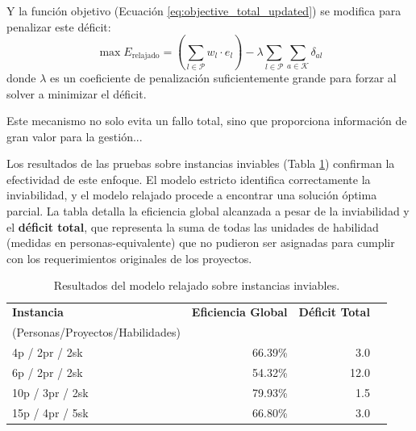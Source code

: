 \documentclass[conference]{IEEEtran}
\begin{document}
Y la función objetivo (Ecuación \ref{eq:objective_total_updated}) se modifica para penalizar este déficit:
\begin{equation}
    \max E_{\text{relajado}} = \left( \sum_{l \in \mathcal{P}} w_l \cdot e_l \right) - \lambda \sum_{l \in \mathcal{P}} \sum_{a \in \mathcal{K}} \delta_{al}
    \label{eq:objective_total_relaxed}
\end{equation}
donde \(\lambda\) es un coeficiente de penalización suficientemente grande para forzar al solver a minimizar el déficit.

Este mecanismo no solo evita un fallo total, sino que proporciona información de gran valor para la gestión...

Los resultados de las pruebas sobre instancias inviables (Tabla \ref{tab:infeasible}) confirman la efectividad de este enfoque. El modelo estricto identifica correctamente la inviabilidad, y el modelo relajado procede a encontrar una solución óptima parcial. La tabla detalla la eficiencia global alcanzada a pesar de la inviabilidad y el \textbf{déficit total}, que representa la suma de todas las unidades de habilidad (medidas en personas-equivalente) que no pudieron ser asignadas para cumplir con los requerimientos originales de los proyectos.

\begin{table}[htbp]
    \centering
    \caption{Resultados del modelo relajado sobre instancias inviables.}
    \label{tab:infeasible}
    \begin{tabularx}{\linewidth}{@{}lrrr@{}}
        \toprule
        \textbf{Instancia}               & \textbf{Eficiencia Global} & \textbf{Déficit Total} \\
        (Personas/Proyectos/Habilidades) &                            &                        \\
        \midrule
        4p / 2pr / 2sk                   & 66.39\%                    & 3.0                    \\
        6p / 2pr / 2sk                   & 54.32\%                    & 12.0                   \\
        10p / 3pr / 2sk                  & 79.93\%                    & 1.5                    \\
        15p / 4pr / 5sk                  & 66.80\%                    & 3.0                    \\
        \bottomrule
    \end{tabularx}
\end{table}
\end{document}
